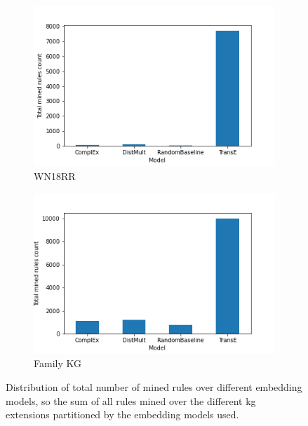 \begin{figure}[htbp]
\centering
\begin{subfigure}{.5\textwidth}
  \centering
  \includegraphics[width=1\linewidth]{figures/results/Total_mined_rules-model-wn18rr.png}
  \caption{WN18RR}
  \label{total_rules_KG_embedding_dist_WN18RR}
\end{subfigure}%
\begin{subfigure}{.5\textwidth}
  \centering
  \includegraphics[width=1\linewidth]{figures/results/Total_mined_rules-model-family.png}
  \caption{Family KG}
  \label{total_rules_KG_embedding_dist_family}
\end{subfigure}
\caption[Number of total mined rules over embedding models]{Distribution of total number of mined rules over different embedding models, so the sum of all rules mined over the different \gls{kg} extensions partitioned by the embedding models used.}
\label{total_rules_KG_embedding_dist}
\end{figure}

